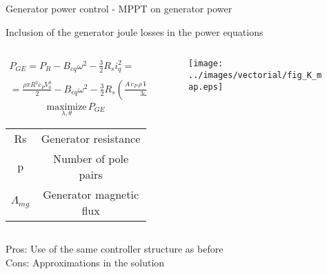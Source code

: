 \begin{frame}{Generator power control - MPPT on generator power}

  Inclusion of the generator joule losses in the power equations
  

  \begin{columns}
    \begin{column}{0.4\columnwidth}
      { \scriptsize
      \begin{gather*}
          P_{GE} = P_R - B_{eq}\omega^2 - \frac{3}{2} R_s i_q^2 =\\
        =\frac{\rho\pi R^2c_PV_0^3}{2} - B_{eq}\omega^2-\frac{3}{2}R_s\left(\frac{A \, c_P \, \rho \, V_0^3 \,-\,2B_{eq}{\omega}^2}{3\omega\,p\,\Lambda_{mg}}\right)^2 
      \end{gather*}
      }
      \begin{equation*}
        \underset{\lambda, \theta}{\text{maximize}} \, P_{GE}
      \end{equation*}
     {\scriptsize 
      \begin{table}
        \begin{tabular}{cc}
          \toprule
          Rs & Generator resistance\\
          p & Number of pole pairs\\
          $\Lambda_{mg}$ & Generator magnetic flux\\
          \bottomrule
        \end{tabular}
      \end{table}
    }
    \end{column}
    \begin{column}{0.6\columnwidth}
      \begin{figure}
        \centering
        \texttt{[image: ../images/vectorial/fig\_K\_map.eps]}
      \end{figure}
    \end{column}
  \end{columns}

\vspace{0.5cm}
\textcolor{yaleblue}{Pros:} Use of the same controller structure as before\\
\textcolor{bostonuniversityred}{Cons:} Approximations in the solution


\end{frame}
